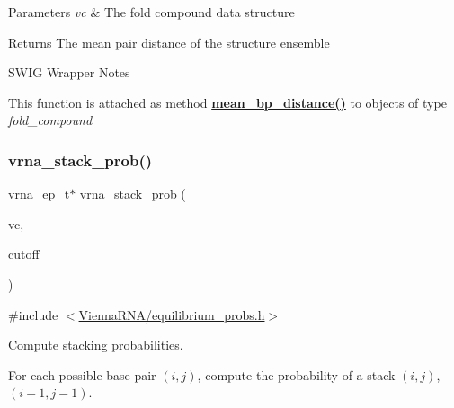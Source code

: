 \begin{DoxyParams}{Parameters}
{\em vc} & The fold compound data structure \\
\hline
\end{DoxyParams}
\begin{DoxyReturn}{Returns}
The mean pair distance of the structure ensemble
\end{DoxyReturn}
\begin{DoxyRefDesc}{S\+W\+I\+G Wrapper Notes}
\item[\hyperlink{wrappers__wrappers000056}{S\+W\+I\+G Wrapper Notes}]This function is attached as method {\bfseries \hyperlink{group__pf__fold_ga79cbc375af65f11609feb6b055269e7d}{mean\+\_\+bp\+\_\+distance()}} to objects of type {\itshape fold\+\_\+compound} \end{DoxyRefDesc}
\mbox{\label{group__pf__fold_ga132664bf29fdc30bb5ea715491d1ab22}} 
\subsubsection{\texorpdfstring{vrna\+\_\+stack\+\_\+prob()}{vrna\_stack\_prob()}}
{\footnotesize\ttfamily \hyperlink{group__struct__utils_gab9ac98ab55ded9fb90043b024b915aca}{vrna\+\_\+ep\+\_\+t}$\ast$ vrna\+\_\+stack\+\_\+prob (\begin{DoxyParamCaption}\item[{\hyperlink{group__fold__compound_ga1b0cef17fd40466cef5968eaeeff6166}{vrna\+\_\+fold\+\_\+compound\+\_\+t} $\ast$}]{vc,  }\item[{double}]{cutoff }\end{DoxyParamCaption})}



{\ttfamily \#include $<$\hyperlink{equilibrium__probs_8h}{Vienna\+R\+N\+A/equilibrium\+\_\+probs.\+h}$>$}



Compute stacking probabilities. 

For each possible base pair $(i,j)$, compute the probability of a stack $(i,j)$, $(i+1, j-1)$.


